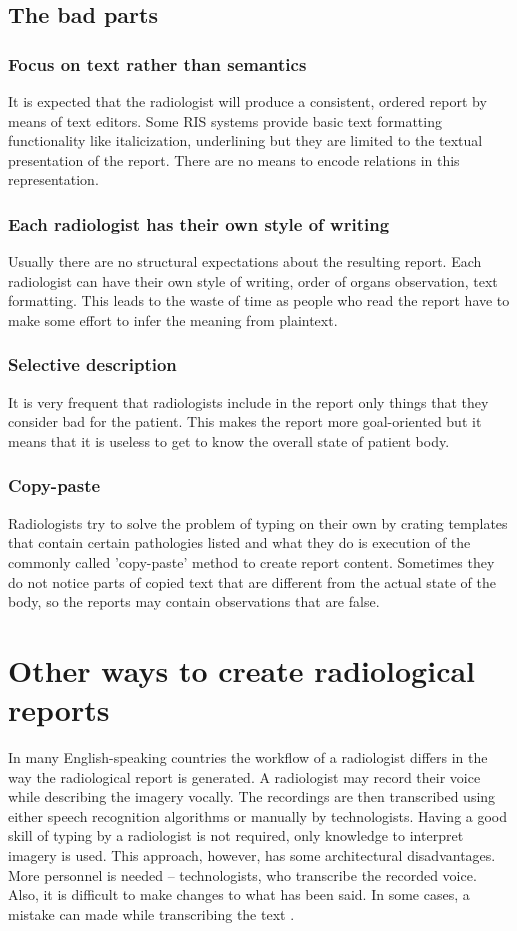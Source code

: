 \documentclass[12pt, twoside, openany]{report}
\theoremstyle{definition}
\begin{document}
\subsection{The bad parts}
\subsubsection{Focus on text rather than semantics}
It is expected that the radiologist will produce a consistent, ordered report by means of text editors. Some RIS systems provide basic text formatting functionality like italicization, underlining but they are limited to the textual presentation of the report. There are no means to encode relations in this representation.
\subsubsection{Each radiologist has their own style of writing}
Usually there are no structural expectations about the resulting report. Each radiologist can have their own style of writing, order of organs observation, text formatting. This leads to the waste of time as people who read the report have to make some effort to infer the meaning from plaintext. 
\subsubsection{Selective description}
It is very frequent that radiologists include in the report only things that they consider bad for the patient. This makes the report more goal-oriented but it means that it is useless to get to know the overall state of patient body.
\subsubsection{Copy-paste}
Radiologists try to solve the problem of typing on their own by crating templates that contain certain pathologies listed and what they do is execution of the commonly called 'copy-paste' method to create report content. Sometimes they do not notice parts of copied text that are different from the actual state of the body, so the reports may contain observations that are false. 

\section{Other ways to create radiological reports}
In many English-speaking countries the workflow of a radiologist differs in the way the radiological report is generated. A radiologist may record their voice while describing the imagery vocally. The recordings are then transcribed using either speech recognition algorithms or manually by technologists. Having a good skill of typing by a radiologist is not required, only knowledge to interpret imagery is used. This approach, however, has some architectural disadvantages. More personnel is needed -- technologists, who transcribe the recorded voice\cite{speech-impact}. Also, it is difficult to make changes to what has been said. In some cases, a mistake can made while transcribing the text \cite{speech-africa}.
\end{document}
